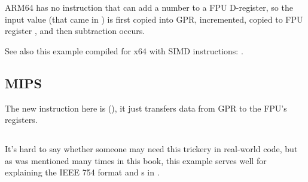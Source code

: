 

ARM64 has no instruction that can add a number to a FPU D-register, 
so the input value (that came in ) is first copied into \ac{GPR},
incremented, copied to FPU register , and then subtraction occurs.



See also this example compiled for x64 with SIMD instructions: .

\subsection{MIPS}


The new instruction here is  (), it just transfers data from \ac{GPR} to the FPU's registers.



\subsection{\Conclusion}

It's hard to say whether someone may need this trickery in real-world code, 
but as was mentioned many times in this book, this example serves well 
for explaining the IEEE 754 format and s in \CCpp.

